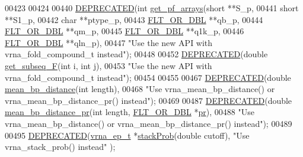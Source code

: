 \begin{DoxyCode}
00423 
00424 
00440 \mbox{\hyperlink{part__func_8h_aab347a3c03fbe8e7319551b9fa0cce4a}{DEPRECATED}}(\textcolor{keywordtype}{int} \mbox{\hyperlink{group__pf__fold_ga42faebdfce6f070c5f89adfc8427525c}{get\_pf\_arrays}}(\textcolor{keywordtype}{short} **S\_p,
00441                   \textcolor{keywordtype}{short} **S1\_p,
00442                   \textcolor{keywordtype}{char} **ptype\_p,
00443                   \mbox{\hyperlink{group__data__structures_ga31125aeace516926bf7f251f759b6126}{FLT\_OR\_DBL}} **qb\_p,
00444                   \mbox{\hyperlink{group__data__structures_ga31125aeace516926bf7f251f759b6126}{FLT\_OR\_DBL}} **qm\_p,
00445                   \mbox{\hyperlink{group__data__structures_ga31125aeace516926bf7f251f759b6126}{FLT\_OR\_DBL}} **q1k\_p,
00446                   \mbox{\hyperlink{group__data__structures_ga31125aeace516926bf7f251f759b6126}{FLT\_OR\_DBL}} **qln\_p),
00447 \textcolor{stringliteral}{"Use the new API with vrna\_fold\_compound\_t instead"});
00448 
00452 \mbox{\hyperlink{part__func_8h_aab347a3c03fbe8e7319551b9fa0cce4a}{DEPRECATED}}(\textcolor{keywordtype}{double} \mbox{\hyperlink{part__func_8h_a189e2a1ec6cc32c53ea72f7543b0441e}{get\_subseq\_F}}(\textcolor{keywordtype}{int} i, \textcolor{keywordtype}{int} j),
00453 \textcolor{stringliteral}{"Use the new API with vrna\_fold\_compound\_t instead"});
00454 
00455 
00467 \mbox{\hyperlink{part__func_8h_aab347a3c03fbe8e7319551b9fa0cce4a}{DEPRECATED}}(\textcolor{keywordtype}{double}  \mbox{\hyperlink{group__pf__fold_ga79cbc375af65f11609feb6b055269e7d}{mean\_bp\_distance}}(\textcolor{keywordtype}{int} length),
00468 \textcolor{stringliteral}{"Use vrna\_mean\_bp\_distance() or vrna\_mean\_bp\_distance\_pr() instead"});
00469 
00487 \mbox{\hyperlink{part__func_8h_aab347a3c03fbe8e7319551b9fa0cce4a}{DEPRECATED}}(\textcolor{keywordtype}{double} \mbox{\hyperlink{group__pf__fold_gad5ba36cef8d01cf4244cc09b9bf1ce1d}{mean\_bp\_distance\_pr}}(\textcolor{keywordtype}{int} length, 
      \mbox{\hyperlink{group__data__structures_ga31125aeace516926bf7f251f759b6126}{FLT\_OR\_DBL}} *\mbox{\hyperlink{fold__vars_8h_ac98ec419070aee6831b44e5c700f090f}{pr}}),
00488 \textcolor{stringliteral}{"Use vrna\_mean\_bp\_distance() or vrna\_mean\_bp\_distance\_pr() instead"});
00489 
00495 \mbox{\hyperlink{part__func_8h_aab347a3c03fbe8e7319551b9fa0cce4a}{DEPRECATED}}(\mbox{\hyperlink{group__struct__utils_structvrna__elem__prob__s}{vrna\_ep\_t}} *\mbox{\hyperlink{part__func_8h_a8f18624bcd0b47d1a266d9e5527e5362}{stackProb}}(\textcolor{keywordtype}{double} cutoff), \textcolor{stringliteral}{"Use vrna\_stack\_prob() instead"}
      );

\end{DoxyCode}
